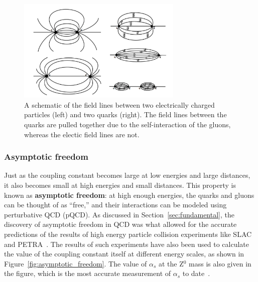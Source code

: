 \begin{figure}[ht]
    \centering
    \includegraphics[width=0.7\textwidth]{figures/introduction/electric_color_fields.png}
    \caption{A schematic of the field lines between two electrically charged particles (left) and two quarks (right). The field lines between the quarks are pulled together due to the self-interaction of the gluons, whereas the electic field lines are not.}
    \label{fig:field_line_differences}
\end{figure}

\subsubsection{Asymptotic freedom}
\label{sec:qcd_asymptotic_freedom}

Just as the coupling constant becomes large at low energies and large distances, it also becomes small at high energies and small distances. This property is known as \textbf{asymptotic freedom}: at high enough energies, the quarks and gluons can be thought of as ``free,'' and their interactions can be modeled using perturbative QCD (pQCD). As discussed in Section~\ref{sec:fundamental}, the discovery of asymptotic freedom in QCD was what allowed for the accurate predictions of the results of high energy particle collision experiments like SLAC~\cite{SLAC} and PETRA~\cite{PETRA}. The results of such experiments have also been used to calculate the value of the coupling constant itself at different energy scales, as shown in Figure~\ref{fig:asymptotic_freedom}. The value of $\alpha_s$ at the Z$^0$ mass is also given in the figure, which is the most accurate measurement of $\alpha_s$ to date~\cite{PDG}. 

